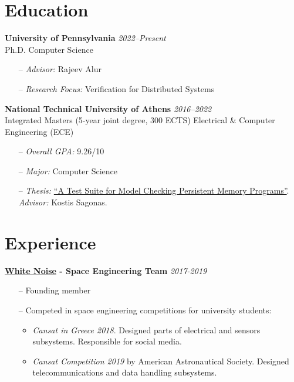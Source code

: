 \documentclass[margin]{res}
\newcommand{\field}[2]{\noindent \textbf{#1} \hfill #2 \\}
\begin{document}
\begin{resume}

\section{Education}

\field{University of Pennsylvania}  {\emph{2022--Present}} 
Ph.D. Computer Science
\begin{itemize}[nosep]
\item[--] \emph{Advisor:} Rajeev Alur
\item[--] \emph{Research Focus:} Verification for Distributed Systems
\end{itemize}
 
\field{National Technical University of Athens}  {\emph{2016--2022}} 
Integrated Masters (5-year joint degree, 300 ECTS) Electrical \& Computer Engineering (ECE)
\begin{itemize}[nosep]
\item[--] \emph{Overall GPA:} 9.26/10 
\item[--] \emph{Major:} Computer Science 
\item[--] \emph{Thesis:} \href{http://artemis.cslab.ece.ntua.gr:8080/jspui/bitstream/123456789/18415/1/thesis.pdf}{``A Test Suite for Model Checking Persistent Memory Programs''}. \emph{Advisor:} Kostis Sagonas.
\end{itemize}

\section{Experience}

\textbf{\href{https://whitenoise.gr/}{White Noise} - Space Engineering Team} \hfill \emph{2017-2019}
\begin{itemize}[nosep]
\item[--] Founding member
\item[--] Competed in space engineering competitions for university students:
\begin{itemize}[nosep]
\item \textit{Cansat in Greece 2018}. 
  Designed parts of electrical and sensors subsystems. 
  Responsible for social media.
\item \textit{Cansat Competition 2019} by American Astronautical Society. 
  Designed telecommunications and data handling subsystems.
\end{itemize}
\end{itemize}


\end{resume}
\end{document}
